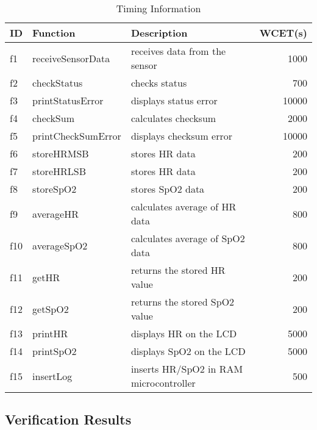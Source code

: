 \documentclass{llncs}
\begin{document}
\renewcommand{\baselinestretch}{1.2}
\setlength{\tabcolsep}{2pt}
\begin{table}[!hbt]
\begin{center}
\caption{Timing Information}
\label{table:deadlines}
\begin{tabular}{l l l r }
\hline
    ID & Function & Description & WCET(s)   \\
\hline\hline
   f1 & receiveSensorData & receives data from the sensor       & 1000 \\ 
   f2 & checkStatus       & checks status      & 700 \\
   f3 & printStatusError  & displays status error     & 10000 \\
   f4 & checkSum     & calculates checksum & 2000 \\
   f5 & printCheckSumError  & displays checksum error     & 10000 \\
   f6 & storeHRMSB         & stores HR data & 200 \\ 
   f7 & storeHRLSB         & stores HR data & 200 \\ 
   f8 & storeSpO2         & stores SpO2 data & 200 \\ 
   f9 & averageHR        & calculates average of HR data & 800 \\ 
   f10 & averageSpO2      & calculates average of SpO2 data & 800 \\ 
   f11 & getHR             & returns the stored HR value         & 200 \\
   f12 & getSpO2           & returns the stored SpO2 value       & 200 \\   
   f13 & printHR           & displays HR on the LCD & 5000 \\   
   f14 & printSpO2         & displays SpO2 on the LCD & 5000 \\   
   f15 & insertLog         & inserts HR/SpO2 in RAM microcontroller & 500 \\
\hline
\end{tabular}
\end{center}
\end{table}


\subsection{Verification Results}
\end{document}
